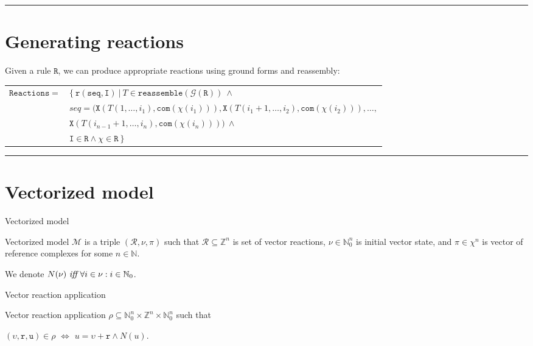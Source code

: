\documentclass[12pt]{fithesis2}
\begin{document}
\noindent\rule{\textwidth}{2pt}

\section{Generating reactions}
\label{Generating reactions}

Given a rule $\mathtt{R}$, we can produce appropriate reactions using ground forms and reassembly:

\begin{tabular}{ ll }
$\mathtt{Reactions} =$ & $\{~ \mathtt{r}(\mathtt{seq}, \mathtt{I}) ~|~ T \in \mathtt{reassemble}(\mathcal{G}(\mathtt{R})) ~\wedge$\\

& $seq = (\mathtt{X}(T(1, \ldots, i_1), \mathtt{com}(\chi(i_1))), \mathtt{X}(T(i_1 + 1, \ldots, i_2), \mathtt{com}(\chi(i_2))), \ldots,$\\

& $\mathtt{X}(T(i_{n-1}+1, \ldots, i_n), \mathtt{com}(\chi(i_n)))) ~\wedge$\\

& $ \mathtt{I} \in \mathtt{R} \wedge \chi \in \mathtt{R} ~\}$
\end{tabular}

\noindent\rule{\textwidth}{1pt}

\section{Vectorized model}

\begin{definition}{Vectorized model}

Vectorized model $\mathcal{M}$ is a triple $(\mathcal{R}, \nu, \pi)$ such that $\mathcal{R} \subseteq \mathbb{Z}^n$ is set of vector reactions, $\nu \in \mathbb{N}_0^n$ is initial vector state, and $\pi \in \chi^n$ is vector of reference complexes for some $n \in \mathbb{N}$.
\end{definition}

\begin{notation}
We denote $N(\nu) ~\emph{iff}~ \forall i \in \nu: i \in \mathbb{N}_0$.
\end{notation}

\begin{definition}{Vector reaction application}

Vector reaction application $\rho \subseteq \mathbb{N}_0^n \times \mathbb{Z}^n \times \mathbb{N}_0^n$ such that 
\begin{center}
$(\upsilon, \mathtt{r}, \mathtt{u}) \in \rho$ $\Leftrightarrow$ $u = \upsilon + \mathtt{r} \wedge N(u)$.
\end{center}
\end{definition}
\end{document}
